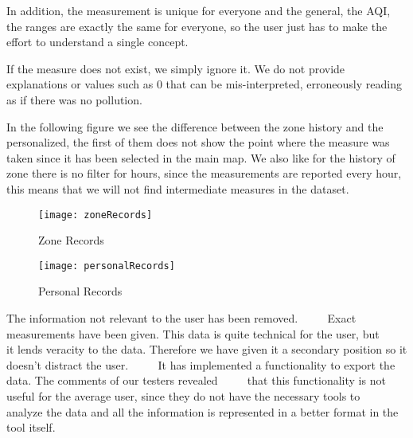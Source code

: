 In addition, the measurement is unique for everyone and the general, the AQI, the ranges are exactly the same for everyone, so the user just has to make the effort to understand a single concept.

If the measure does not exist, we simply ignore it. We do not provide explanations or values such as 0 that can be mis-interpreted, erroneously reading as if there was no pollution.


In the following figure we see the difference between the zone history and the personalized, the first of them does not show
the point where the measure was taken since it has been selected in the main map. We also like for the history of
zone there is no filter for hours, since the measurements are reported every hour, this means that we will not find
intermediate measures in the dataset.
 \newpage
\begin{figure}[ht]
    \centering
    \texttt{[image: zoneRecords]}
    \caption{Zone Records}
\end{figure}
\begin{figure}[ht]
    \centering
    \texttt{[image: personalRecords]}
    \caption{Personal Records}
\end{figure}


\begin{itemize}
    \done The information not relevant to the user has been removed.
         \crossed Exact measurements have been given. This data is quite technical for the user, but 
         it lends veracity to the data. Therefore we have given it a secondary position so it doesn't distract the user.
         \crossed It has implemented a functionality to export the data. The comments of our testers revealed
         that this functionality is not useful for the average user, since they do not have the necessary tools to
         analyze the data and all the information is represented in a better format in the tool itself.
    
\end{itemize}
 \newpage